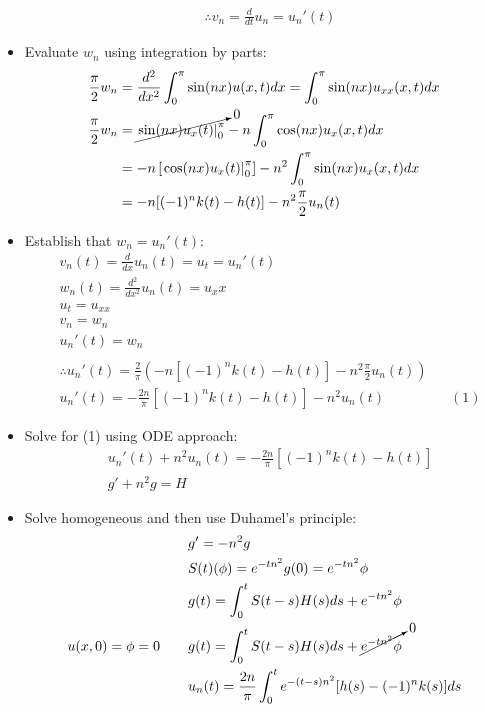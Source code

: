 \documentclass[12pt, a4paper]{article}
\begin{document}
\begin{itemize}
\begin{align*}
        &\therefore v_n = \frac{d}{dt}u_n = u_n'(t)
    \end{align*}
    \item Evaluate $w_n$ using integration by parts:
    \begin{align*}
        \frac{\pi}{2}w_n &=\frac{d^2}{dx^2}\int_0^\pi\sin(nx)u(x, t)dx=\int_0^\pi \sin(nx)u_{xx}(x, t)dx\\
        \frac{\pi}{2}w_n &=\cancelto{0}{\left.\sin(nx)u_x(t)\right\rvert_0^\pi} - n\int_0^\pi \cos(nx)u_x(x, t)dx\\
        &=-n\left[\left.\cos(nx)u_x(t)\right\rvert_0^\pi\right]-n^2\int_0^\pi \sin(nx)u_x(x, t)dx\\
        &=-n[(-1)^nk(t)-h(t)]-n^2\frac{\pi}{2}u_n(t)\\
    \end{align*}
    \item Establish that $w_n = u_n'(t)$:
    \begin{align*}
        &v_n(t) = \frac{d}{dx}u_n(t) = u_t = u_n'(t)\\
        &w_n(t) = \frac{d^2}{dx^2}u_n(t) = u_xx\\
        &u_t = u_{xx}\\
        &v_n = w_n\\
        &u_n'(t)= w_n\\\\
        &\therefore u_n'(t)=\frac{2}{\pi}\left(-n[(-1)^nk(t)-h(t)]-n^2\frac{\pi}{2}u_n(t)\right) \\
        &u_n'(t)=-\frac{2n}{\pi}[(-1)^nk(t)-h(t)]-n^2u_n(t) && (1)
    \end{align*}
    \item Solve for (1) using ODE approach:
    \begin{align*}
        &u_n'(t)+n^2u_n(t)=-\frac{2n}{\pi}[(-1)^nk(t)-h(t)]\\
        &g' +n^2g = H    
    \end{align*}
    \item Solve homogeneous and then use Duhamel's principle:
    \begin{align*}
        &g' = -n^2g\\
        &S(t)(\phi)= e^{-tn^2}g(0)= e^{-tn^2}\phi\\
        &g(t) = \int_0^t S(t-s)H(s)ds + e^{-tn^2}\phi\\
        u(x, 0) = \phi = 0 \qquad &g(t) = \int_0^t S(t-s)H(s)ds + \cancelto{0}{e^{-tn^2}\phi}\\
        &u_n(t) = \frac{2n}{\pi} \int_0^t e^{-(t-s)n^2}[h(s) - (-1)^nk(s)]ds\\\\

\end{align*}
\end{itemize}
\end{document}
